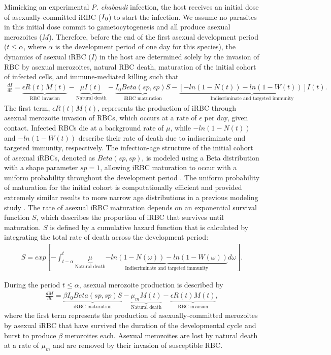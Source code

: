 \documentclass[10pt,letterpaper]{article}
\begin{document}
Mimicking an experimental \emph{P. chabaudi} infection, the host receives an initial dose of asexually-committed iRBC ($I\textsubscript{0}$) to start the infection. We assume no parasites in this initial dose commit to gametocytogenesis and all produce asexual merozoites ($M$). Therefore, before the end of the first asexual development period ($t\le\alpha$, where $\alpha$ is the development period of one day for this species), the dynamics of asexual iRBC ($I$) in the host are determined solely by the invasion of RBC by asexual merozoites, natural RBC death, maturation of the initial cohort of infected cells, and immune-mediated killing such that
\begin{eqnarray}
\label{eq:scheme1}
    \frac{dI}{dt} = \underbrace{\epsilon R(t)M(t)}_{\text{RBC invasion}}-\underbrace{\mu I(t)}_{\text{Natural death}}-\underbrace{I_{0}Beta(sp,sp)S}_{\text{iRBC maturation}}-\underbrace{[-ln(1-N(t))-ln(1-W(t))]I(t)}_{\text{Indiscriminate and targeted immunity}}. 
\end{eqnarray}
The first term, $\epsilon R(t)M(t)$, represents the production of iRBC through asexual merozoite invasion of RBCs, which occurs at a rate of $\epsilon$ per day, given contact. Infected RBCs die at a background rate of $\mu$, while $-ln(1-N(t))$ and \(-ln(1-W(t))\) describe their rate of death due to indiscriminate and targeted immunity, respectively. The infection-age structure of the initial cohort of asexual iRBCs, denoted as \(Beta(sp,sp)\), is modeled using a Beta distribution with a shape parameter $sp=1$, allowing iRBC maturation to occur with a uniform probability throughout the development period \cite{greischar_synchrony_2014}. The uniform probability of maturation for the initial cohort is computationally efficient and provided extremely similar results to more narrow age distributions in a previous modeling study \cite{greischar_predicting_2016}. The rate of asexual iRBC maturation depends on an exponential survival function $S$, which describes the proportion of iRBC that survives until maturation. $S$ is defined by a cumulative hazard function that is calculated by integrating the total rate of death across the development period:
\begin{eqnarray}
\label{eq:scheme2}
    S = exp[-\int_{t-\alpha}^{t} \underbrace{\mu}_{\text{Natural death}}\underbrace{-ln(1-N(\omega))-ln(1-W(\omega))}_{\text{Indiscriminate and targeted immunity}}d\omega].
\end{eqnarray}

During the period $t\le\alpha$, asexual merozoite production is described by
\begin{eqnarray}
\label{eq:scheme3}
    \frac{dM}{dt}=\underbrace{\beta I_{0}Beta(sp,sp)S}_{\text{iRBC maturation}}-\underbrace{\mu _{m}M(t)}_{\text{Natural death}}-\underbrace{\epsilon R(t)M(t)}_{\text{RBC invasion}},
\end{eqnarray}
where the first term represents the production of asexually-committed merozoites by asexual iRBC that have survived the duration of the developmental cycle and burst to produce $\beta$ merozoites each. Asexual merozoites are lost by natural death at a rate of $\mu_{m}$ and are removed by their invasion of susceptible RBC.\newline
\end{document}
